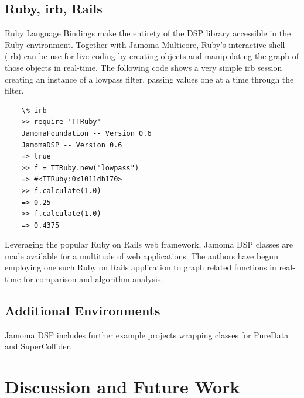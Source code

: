 \documentclass[twoside,10pt]{article}
\begin{document}
\subsection{Ruby, irb, Rails}
Ruby Language Bindings make the entirety of the DSP library accessible in the Ruby environment.  Together with Jamoma Multicore, Ruby's interactive shell (irb) can be use for live-coding by creating objects and manipulating the graph of those objects in real-time.  The following code shows a very simple irb session creating an instance of a lowpass filter, passing values one at a time through the filter.

\begin{lstlisting}
    \% irb
    >> require 'TTRuby'
    JamomaFoundation -- Version 0.6
    JamomaDSP -- Version 0.6
    => true
    >> f = TTRuby.new("lowpass")
    => #<TTRuby:0x1011db170>
    >> f.calculate(1.0)
    => 0.25
    >> f.calculate(1.0)
    => 0.4375
\end{lstlisting}

\noindent Leveraging the popular Ruby on Rails web framework, Jamoma DSP classes are made available for a multitude of web applications.  The authors have begun employing one such Ruby on Rails application to graph related functions in real-time for comparison and algorithm analysis.


\subsection{Additional Environments}

Jamoma DSP includes further example projects wrapping classes for PureData and SuperCollider.




\section{Discussion and Future Work} %

\end{document}
